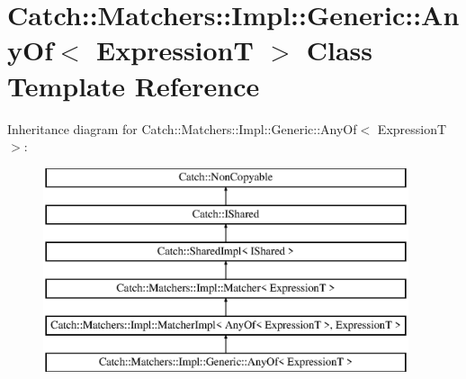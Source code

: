 \hypertarget{class_catch_1_1_matchers_1_1_impl_1_1_generic_1_1_any_of}{}\section{Catch\+:\+:Matchers\+:\+:Impl\+:\+:Generic\+:\+:Any\+Of$<$ ExpressionT $>$ Class Template Reference}
\label{class_catch_1_1_matchers_1_1_impl_1_1_generic_1_1_any_of}
Inheritance diagram for Catch\+:\+:Matchers\+:\+:Impl\+:\+:Generic\+:\+:Any\+Of$<$ ExpressionT $>$\+:\begin{figure}[H]
\begin{center}
\leavevmode
\includegraphics[height=6.000000cm]{class_catch_1_1_matchers_1_1_impl_1_1_generic_1_1_any_of}
\end{center}
\end{figure}
